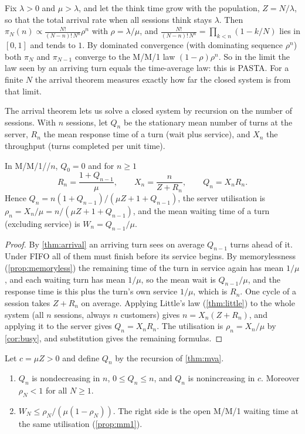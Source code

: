 \begin{remark}\label{L4:rem:arrival-limit}
Fix $\lambda>0$ and $\mu>\lambda$, and let the think time grow with the population,
$Z=N/\lambda$, so that the total arrival rate when all sessions think stays $\lambda$.
Then $\pi_N(n)\propto\frac{N!}{(N-n)!\,N^n}\rho^n$ with $\rho=\lambda/\mu$, and
$\frac{N!}{(N-n)!\,N^n}=\prod_{k<n}(1-k/N)$ lies in $[0,1]$ and tends to $1$. By
dominated convergence (with dominating sequence $\rho^n$) both $\pi_N$ and
$\pi_{N-1}$ converge to the M/M/1 law $(1-\rho)\rho^n$. So in the limit the law seen
by an arriving turn equals the time-average law: this is PASTA. For a finite $N$ the
arrival theorem measures exactly how far the closed system is from that limit.
\end{remark}

The arrival theorem lets us solve a closed system by recursion on the number of
sessions. With $n$ sessions, let $Q_n$ be the stationary mean number of turns at
the server, $R_n$ the mean response time of a turn (wait plus service), and $X_n$
the throughput (turns completed per unit time).

\begin{theorem}\label{thm:mva}
In M/M/1//$n$, $Q_0=0$ and for $n\ge1$
\[
  R_n=\frac{1+Q_{n-1}}{\mu},\qquad X_n=\frac{n}{Z+R_n},\qquad Q_n=X_nR_n .
\]
Hence $Q_n=n(1+Q_{n-1})/(\mu Z+1+Q_{n-1})$, the server utilisation is
$\rho_n=X_n/\mu=n/(\mu Z+1+Q_{n-1})$, and the mean waiting time of a turn
(excluding service) is $W_n=Q_{n-1}/\mu$.
\end{theorem}

\begin{proof}
By \cref{thm:arrival} an arriving turn sees on average $Q_{n-1}$ turns ahead of
it. Under FIFO all of them must finish before its service begins. By
memorylessness (\cref{prop:memoryless}) the remaining time of the turn in service
again has mean $1/\mu$, and each waiting turn has mean $1/\mu$, so the mean wait
is $Q_{n-1}/\mu$, and the response time is this plus the turn's own service
$1/\mu$, which is $R_n$. One cycle of a session takes $Z+R_n$ on average.
Applying Little's law (\cref{thm:little}) to the whole system (all $n$ sessions,
always $n$ customers) gives $n=X_n(Z+R_n)$, and applying it to the server gives
$Q_n=X_nR_n$. The utilisation is $\rho_n=X_n/\mu$ by \cref{cor:busy}, and
substitution gives the remaining formulas.
\end{proof}

\begin{proposition}\label{prop:finite}
Let $c=\mu Z>0$ and define $Q_n$ by the recursion of \cref{thm:mva}.
\begin{enumerate}[label=(\roman*)]
\item $Q_n$ is nondecreasing in $n$, $0\le Q_n\le n$, and $Q_n$ is nonincreasing
  in $c$. Moreover $\rho_N<1$ for all $N\ge1$.
\item $W_N\le\rho_N/(\mu(1-\rho_N))$. The right side is the open M/M/1 waiting
  time at the same utilisation (\cref{prop:mm1}).
\end{enumerate}
\end{proposition}

